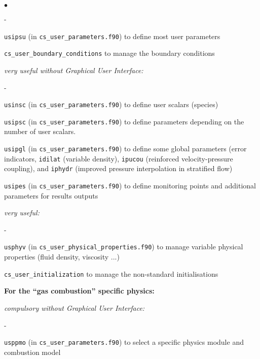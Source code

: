 {{{\begin{list}{$\bullet$}{}
\begin{list}{}{}
\begin{list}{}{}
\begin{list}{-}{}
            \item \texttt{usipsu} (in \texttt{cs\_user\_parameters.f90}) to
              define most user parameters

            \item \texttt{cs\_user\_boundary\_conditions} to manage the boundary conditions
        \end{list}

        \item {\em  very useful without Graphical User Interface:}
        \begin{list}{-}{}
            \item \texttt{usinsc} (in \texttt{cs\_user\_parameters.f90}) to
              define user scalars (species)

            \item \texttt{usipsc} (in \texttt{cs\_user\_parameters.f90}) to
              define parameters depending on the number of user scalars.

            \item \texttt{usipgl} (in \texttt{cs\_user\_parameters.f90}) to
              define some global parameters (error indicators, \texttt{idilat}
              (variable density), \texttt{ipucou} (reinforced velocity-pressure
              coupling), and \texttt{iphydr} (improved pressure interpolation in
              stratified flow)

            \item \texttt{usipes} (in \texttt{cs\_user\_parameters.f90}) to
              define monitoring points and additional parameters for results outputs
        \end{list}

        \item {\em  very useful:}
        \begin{list}{-}{}
            \item \texttt{usphyv} (in
              \texttt{cs\_user\_physical\_properties.f90}) to manage variable physical
                  properties (fluid density, viscosity ...)

            \item \texttt{cs\_user\_initialization} to manage the non-standard initialisations
        \end{list}
    \end{list}

  \item{\bf For the ``gas combustion'' specific physics:}

    \begin{list}{}{}
        \item {\em compulsory without Graphical User Interface:}
        \begin{list}{-}{}
            \item \texttt{usppmo} (in \texttt{cs\_user\_parameters.f90})
               to select a specific physics module and combustion model
        \end{list}


\end{list}
\end{list}
\end{list}}}}

